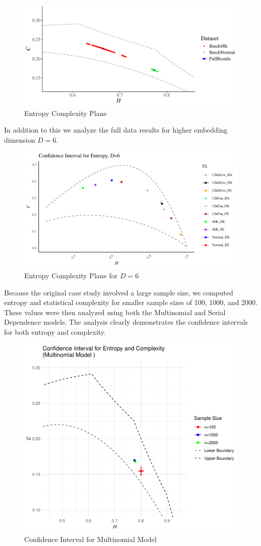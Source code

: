 \begin{figure}[hbt]
	\centering
	\includegraphics[width=0.8 \textwidth]{confidence_interval}
	\caption{Entropy Complexity Plane}
	\label{fig:EntopyComplexity Plane}
\end{figure}

In addition to this we analyze the full data results for higher embedding dimension $D=6$.
	\begin{figure}[hbt]
	\centering
	\includegraphics[width=0.8 \textwidth]{Confidence Interval}
	\caption{Entropy Complexity Plane for $D=6$}
	\label{fig:EntopyComplexity Plane D=6}
\end{figure}

Because the original case study involved a large sample size, we computed entropy and statistical complexity for smaller sample sizes of 100, 1000, and 2000. These values were then analyzed using both the Multinomial and Serial Dependence models. The analysis clearly demonstrates the confidence intervals for both entropy and complexity.	

\begin{figure}[H]
	\centering
	\includegraphics[width=0.8 \textwidth]{CI for Multinomial model}
	\caption{Confidence Interval for Multinomial Model}
	\label{fig:CIMultinorm}
\end{figure}

